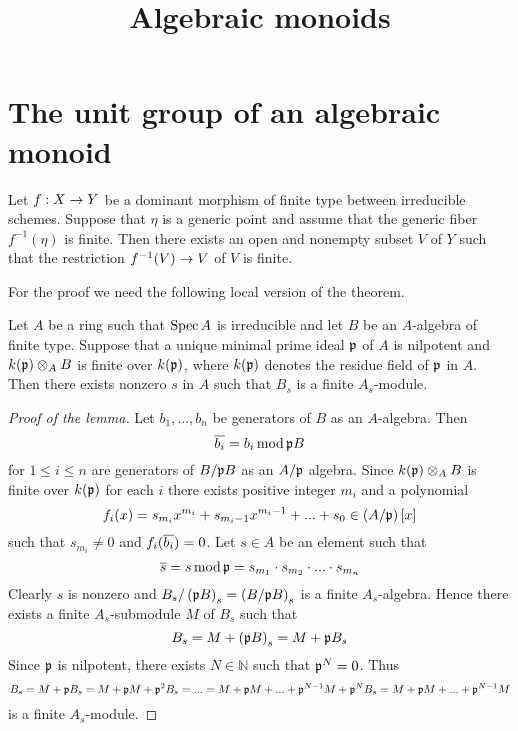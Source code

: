 



\title{Algebraic monoids}
\date{}
\maketitle

\section{The unit group of an algebraic monoid}

\begin{theorem}\label{theorem:generically_finite_morphisms_are_finite_on_some_neighborhood}
Let $f:X\rightarrow Y$ be a dominant morphism of finite type between irreducible schemes. Suppose that $\eta$ is a generic point and assume that the generic fiber $f^{-1}(\eta)$ is finite. Then there exists an open and nonempty subset $V$ of $Y$ such that the restriction $f^{-1}(V)\rightarrow V$ of $V$ is finite.
\end{theorem}
\noindent
For the proof we need the following local version of the theorem.

\begin{lemma}\label{lemma:generically_finite_means_finite_on_some_neighborhood_local_version}
Let $A$ be a ring such that $\mathrm{Spec}\, A$ is irreducible and let $B$ be an $A$-algebra of finite type. Suppose that a unique minimal prime ideal $\mathfrak{p}$ of $A$ is nilpotent and $k(\mathfrak{p})\otimes_AB$ is finite over $k(\mathfrak{p})$, where $k(\mathfrak{p})$ denotes the residue field of $\mathfrak{p}$ in $A$. Then there exists nonzero $s$ in $A$ such that $B_s$ is a finite $A_s$-module.
\end{lemma}
\begin{proof}[Proof of the lemma]
Let $b_1,...,b_n$ be generators of $B$ as an $A$-algebra. Then
$$\overline{b_i} = b_i\,\mathrm{mod}\,\mathfrak{p}B$$
for $1 \leq i\leq n$ are generators of $B/\mathfrak{p}B$ as an $A/\mathfrak{p}$ algebra. Since $k(\mathfrak{p})\otimes_AB$ is finite over $k(\mathfrak{p})$ for each $i$ there exists positive integer $m_i$ and a polynomial
$$f_i(x) = s_{m_i}x^{m_i}+s_{m_i-1}x^{m_i-1}+...+s_0\in \left(A/\mathfrak{p}\right)[x]$$
such that $s_{m_i}\neq 0$ and $f_i(\overline{b_i}) = 0$. Let $s\in A$ be an element such that
$$\overline{s} = s\,\mathrm{mod}\,\mathfrak{p} = s_{m_1}\cdot s_{m_2}\cdot ...\cdot s_{m_n}$$
Clearly $s$ is nonzero and $B_s/\left(\mathfrak{p}B\right)_s = \left(B/\mathfrak{p}B\right)_s$ is a finite $A_s$-algebra. Hence there exists a finite $A_s$-submodule $M$ of $B_s$ such that
$$B_s = M + \left(\mathfrak{p}B\right)_s = M + \mathfrak{p}B_s$$
Since $\mathfrak{p}$ is nilpotent, there exists $N\in \mathbb{N}$ such that $\mathfrak{p}^N = 0$. Thus
$$B_s = M + \mathfrak{p}B_s = M + \mathfrak{p}M + \mathfrak{p}^2B_s = ... = M + \mathfrak{p}M + ... + \mathfrak{p}^{N-1}M + \mathfrak{p}^NB_s = M + \mathfrak{p}M + ... + \mathfrak{p}^{N-1}M$$
is a finite $A_s$-module.
\end{proof}

